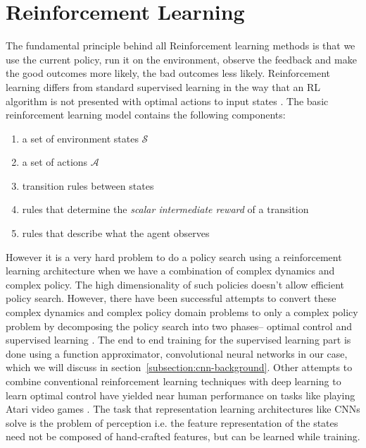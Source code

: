 \section*{Reinforcement Learning}
\label{section:RL}
The fundamental principle behind all Reinforcement learning methods is that we 
use the current policy, run it on the environment, observe the feedback and 
make the good outcomes more likely, the bad outcomes less likely. Reinforcement 
learning differs from standard supervised learning in the way that an RL 
algorithm is not presented with optimal actions to input states 
\cite{sutton1998reinforcement}. The basic reinforcement learning model contains 
the following components:
\begin{enumerate}
 \item a set of environment states $\mathcal{S}$
 \item a set of actions $\mathcal{A}$
 \item transition rules between states
 \item rules that determine the \textit{scalar intermediate reward} of a 
transition
\item rules that describe what the agent observes
\end{enumerate}
However it is a very hard problem to do a policy search using a reinforcement 
learning architecture when we have a combination of complex dynamics and 
complex policy. The high dimensionality of such policies doesn't allow 
efficient policy search. However, there have been successful attempts to 
convert these complex dynamics and complex policy domain problems to only a 
complex policy problem by decomposing the policy search into two phases-- 
optimal control and supervised learning \cite{levine2015end}. The end to end 
training for the supervised learning part is done using a function 
approximator, convolutional neural networks in our case, which we will 
discuss in section~\ref{subsection:cnn-background}. 
Other attempts to combine conventional reinforcement learning techniques with 
deep learning to learn optimal control have yielded near human performance on 
tasks like playing Atari video games \cite{deepmind_nips}. The task that 
representation learning architectures like CNNs solve is the problem of 
perception i.e. the feature representation of the states need not be 
composed of hand-crafted features, but can be learned while training.

